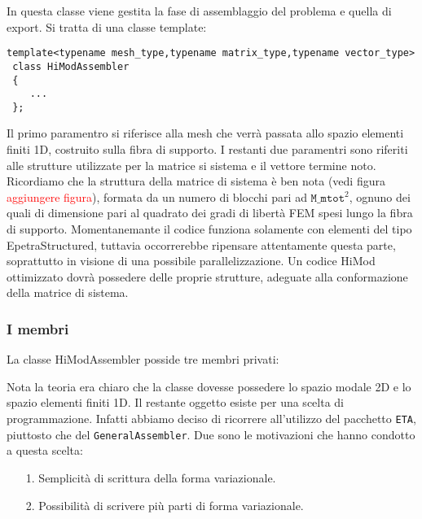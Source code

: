  In questa classe viene gestita la fase di assemblaggio del problema e quella di export. Si tratta di una classe template:
 \begin{lstlisting}[style = general]
 template<typename mesh_type,typename matrix_type,typename vector_type>
 class HiModAssembler
 {
	... 
 };
 \end{lstlisting}
 Il primo paramentro si riferisce alla mesh che verr\`a passata allo spazio elementi finiti 1D, costruito sulla fibra di supporto. I restanti due paramentri sono riferiti alle strutture utilizzate per la matrice si sistema e il vettore termine noto. Ricordiamo che la struttura della matrice di sistema \`e ben nota (vedi figura \textcolor{red}{aggiungere figura}), formata da un numero di blocchi pari ad $\texttt{M\_mtot}^2$, ognuno dei quali di dimensione pari al quadrato dei gradi di libert\`a FEM spesi lungo la fibra di supporto.
 Momentanemante il codice funziona solamente con elementi del tipo EpetraStructured, tuttavia occorrerebbe ripensare attentamente questa parte, soprattutto in visione di una possibile parallelizzazione.
Un codice HiMod ottimizzato dovr\`a possedere delle proprie strutture, adeguate alla conformazione della matrice di sistema.

\subsubsection{I membri}
La classe HiModAssembler posside tre membri privati:


Nota la teoria era chiaro che la classe dovesse possedere lo spazio modale 2D e lo spazio elementi finiti 1D.
Il restante oggetto esiste per una scelta di programmazione. Infatti abbiamo deciso di ricorrere all'utilizzo del pacchetto \texttt{ETA}, piuttosto che del \texttt{GeneralAssembler}. Due sono le motivazioni che hanno condotto a questa scelta:
\begin{itemize}
\item[1.] Semplicit\`a di scrittura della forma variazionale.
\item[2.] Possibilit\`a di scrivere pi\`u parti di forma variazionale.
\end{itemize}

